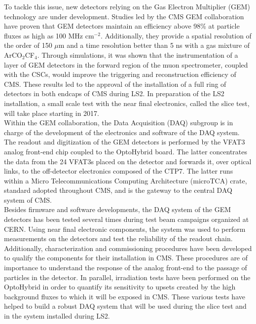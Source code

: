   To tackle this issue, new detectors relying on the Gas Electron Multiplier (GEM) technology are under development. Studies led by the CMS GEM collaboration have proven that GEM detectors maintain an efficiency above 98\% at particle fluxes as high as 100 MHz cm$^{-2}$. Additionally, they provide a spatial resolution of the order of 150 $\mu$m and a time resolution better than 5 ns with a gas mixture of ArCO$_2$CF$_4$. Through simulations, it was shown that the instrumentation of a layer of GEM detectors in the forward region of the muon spectrometer, coupled with the CSCs, would improve the triggering and reconstruction efficiency of CMS. These results led to the approval of the installation of a full ring of detectors in both endcaps of CMS during LS2. In preparation of the LS2 installation, a small scale test with the near final electronics, called the slice test, will take place starting in 2017. \\

  Within the GEM collaboration, the Data Acquisition (DAQ) subgroup is in charge of the development of the electronics and software of the DAQ system. The readout and digitization of the GEM detectors is performed by the VFAT3 analog front-end chip coupled to the OptoHybrid board. The latter concentrates the data from the 24 VFAT3s placed on the detector and forwards it, over optical links, to the off-detector electronics composed of the CTP7. The latter runs within a Micro Telecommunications Computing Architecture (microTCA) crate, standard adopted throughout CMS, and is the gateway to the central DAQ system of CMS. \\

  Besides firmware and software developments, the DAQ system of the GEM detectors has been tested several times during test beam campaigns organized at CERN. Using near final electronic components, the system was used to perform measurements on the detectors and test the reliability of the readout chain. Additionally, characterization and commissioning procedures have been developed to qualify the components for their installation in CMS. These procedures are of importance to understand the response of the analog front-end to the passage of particles in the detector. In parallel, irradiation tests have been performed on the OptoHybrid in order to quantify its sensitivity to upsets created by the high background fluxes to which it will be exposed in CMS. These various tests have helped to build a robust DAQ system that will be used during the slice test and in the system installed during LS2. \\

